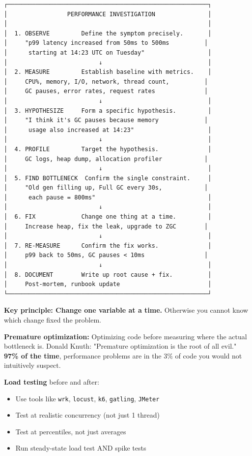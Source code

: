 \documentclass[11pt]{article}
\providecommand{\tightlist}{\setlength{\itemsep}{1pt}\setlength{\parskip}{0pt}}
\begin{document}
\begin{verbatim}
┌─────────────────────────────────────────────────────────┐
│                 PERFORMANCE INVESTIGATION               │
│                                                         │
│  1. OBSERVE         Define the symptom precisely.       │
│     "p99 latency increased from 50ms to 500ms          │
│      starting at 14:23 UTC on Tuesday"                  │
│                          ↓                              │
│  2. MEASURE         Establish baseline with metrics.    │
│     CPU%, memory, I/O, network, thread count,          │
│     GC pauses, error rates, request rates              │
│                          ↓                              │
│  3. HYPOTHESIZE     Form a specific hypothesis.         │
│     "I think it's GC pauses because memory             │
│      usage also increased at 14:23"                     │
│                          ↓                              │
│  4. PROFILE         Target the hypothesis.              │
│     GC logs, heap dump, allocation profiler            │
│                          ↓                              │
│  5. FIND BOTTLENECK  Confirm the single constraint.     │
│     "Old gen filling up, Full GC every 30s,            │
│      each pause = 800ms"                                │
│                          ↓                              │
│  6. FIX             Change one thing at a time.         │
│     Increase heap, fix the leak, upgrade to ZGC        │
│                          ↓                              │
│  7. RE-MEASURE      Confirm the fix works.              │
│     p99 back to 50ms, GC pauses < 10ms                 │
│                          ↓                              │
│  8. DOCUMENT        Write up root cause + fix.          │
│     Post-mortem, runbook update                         │
└─────────────────────────────────────────────────────────┘
\end{verbatim}

\textbf{Key principle: Change one variable at a time.} Otherwise you cannot know which change fixed the problem.

\textbf{Premature optimization:} Optimizing code before measuring where the actual bottleneck is. Donald Knuth: "Premature optimization is the root of all evil." \textbf{97\% of the time}, performance problems are in the 3\% of code you would not intuitively suspect.

\textbf{Load testing} before and after:

\begin{itemize}
\tightlist
\item
  Use tools like \texttt{wrk}, \texttt{locust}, \texttt{k6}, \texttt{gatling}, \texttt{JMeter}
\item
  Test at realistic concurrency (not just 1 thread)
\item
  Test at percentiles, not just averages
\item
  Run steady-state load test AND spike tests
\end{itemize}
\end{document}
